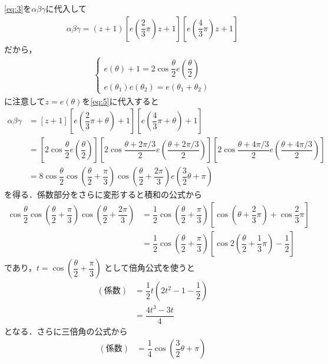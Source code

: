 \documentclass[../../main.tex]{subfiles}
\begin{document}
\cref{eq:3}を$\alpha\beta\gamma$に代入して
\begin{align}
  \alpha \beta \gamma
  = \left(z+1 \right)\left[ e\left(\dfrac{2}{3}\pi\right)z + 1 \right] \left[ e\left(\dfrac{4}{3}\pi\right)z + 1 \right] \label{eq:5}
\end{align}
だから，
\begin{align}
  \begin{cases}
    e(\theta) + 1 = 2 \cos \dfrac{\theta}{2} e\left(\dfrac{\theta}{2}\right) \\
    e(\theta_1)e(\theta_2) = e(\theta_1+\theta_2)
  \end{cases} \label{eq:6}
\end{align}
に注意して$z=e(\theta)$を\cref{eq:5}に代入すると
\begin{align}
  \alpha\beta\gamma
  &=  \left[ z+1 \right]\left[ e\left(\dfrac{2}{3}\pi+\theta\right) + 1 \right] \left[ e\left(\dfrac{4}{3}\pi+\theta\right) + 1 \right] \\
  &=  \left[ 2 \cos \dfrac{\theta}{2} e\left(\dfrac{\theta}{2}\right) \right]
  \left[ 2 \cos \dfrac{\theta+2\pi/3}{2} e\left(\dfrac{\theta+2\pi/3}{2}\right)\right]
  \left[ 2 \cos \dfrac{\theta+4\pi/3}{2} e\left(\dfrac{\theta+4\pi/3}{2}\right)\right] \\
  &=  8\cos \dfrac{\theta}{2} \cos \left(\dfrac{\theta}{2} + \dfrac{\pi}{3}\right) \cos \left(\dfrac{\theta}{2} + \dfrac{2\pi}{3}\right) e\left(\dfrac{3}{2}\theta + \pi\right) \label{eq:7}
\end{align}
を得る．係数部分をさらに変形すると積和の公式から
\begin{align}
  \cos \dfrac{\theta}{2} \cos \left(\dfrac{\theta}{2} + \dfrac{\pi}{3}\right) \cos \left(\dfrac{\theta}{2} + \dfrac{2\pi}{3}\right)
  &= \dfrac{1}{2} \cos \left(\dfrac{\theta}{2} + \dfrac{\pi}{3}\right) \left[ \cos \left(\theta + \dfrac{2}{3}\pi\right) + \cos \dfrac{2}{3}\pi \right] \\
  &= \dfrac{1}{2}\cos \left(\dfrac{\theta}{2} + \dfrac{\pi}{3}\right) \left[ \cos 2\left(\dfrac{\theta}{2} + \dfrac{1}{3}\pi\right) - \dfrac{1}{2} \right]
\end{align}
であり，$t = \cos(\dfrac{\theta}{2} + \dfrac{\pi}{3})$ として倍角公式を使うと
\begin{align}
  (\text{係数})
  &= \dfrac{1}{2}t(2t^2 - 1 - \dfrac{1}{2}) \\
  &= \dfrac{4t^3 - 3t}{4}
\end{align}
となる．さらに三倍角の公式から
\begin{align}
  (\text{係数}) &= \dfrac{1}{4}\cos \left(\dfrac{3}{2}\theta + \pi\right)
\end{align}
\end{document}
